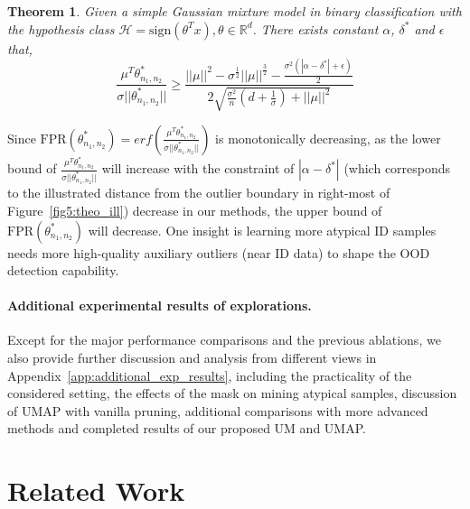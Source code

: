 \documentclass{article}
\theoremstyle{plain}
\newtheorem{theorem}{Theorem}[section]
\theoremstyle{definition}
\theoremstyle{remark}
\begin{document}
\begin{theorem}
    Given a simple Gaussian mixture model in binary classification with the hypothesis class $\mathcal{H}={\text{sign}(\theta^Tx), \theta\in \mathbb{R}^d}$. There exists constant $\alpha$, $\delta^*$ and $\epsilon$ that,
    \begin{equation}
\frac{\mu^T\theta^*_{n_1,n_2}}{\sigma||\theta^*_{n_1,n_2}||} \geq \frac{||\mu||^2-\sigma^{\frac{1}{2}}||\mu||^{\frac{3}{2}}-\frac{\sigma^2(|\alpha-\delta^*|+\epsilon)}{2}}{2\sqrt{\frac{\sigma^2}{n}(d+\frac{1}{\sigma}) + ||\mu||^2}}
\end{equation}
\end{theorem}
Since $\text{FPR}(\theta^*_{n_1,n_2})=erf(\frac{\mu^T\theta^*_{n_1,n_2}}{\sigma||\theta^*_{n_1,n_2}||})$ is monotonically decreasing, as the lower bound of $\frac{\mu^T\theta^*_{n_1,n_2}}{\sigma||\theta^*_{n_1,n_2}||}$ will increase with the constraint of $|\alpha-\delta^*|$ (which corresponds to the illustrated distance from the outlier boundary in right-most of Figure~\ref{fig5:theo_ill}) decrease in our methods, the upper bound of $\text{FPR}(\theta^*_{n_1,n_2})$ will decrease. One insight is learning more atypical ID samples needs more high-quality auxiliary outliers (near ID data) to shape the OOD detection capability.

\paragraph{Additional experimental results of explorations.} 
Except for the major performance comparisons and the previous ablations, we also provide further discussion and analysis from different views in Appendix~\ref{app:additional_exp_results}, including the practicality of the considered setting, the effects of the mask on mining atypical samples, discussion of UMAP with vanilla pruning, additional comparisons with more advanced methods and completed results of our proposed UM and UMAP.


\section{Related Work}
\end{document}
